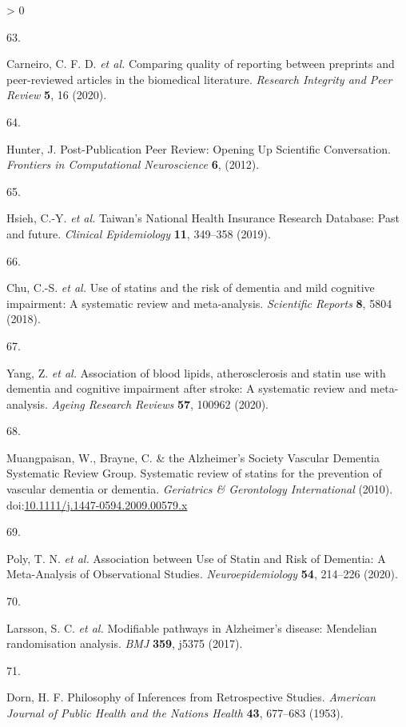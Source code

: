 \documentclass[a4paper, twoside]{templates/ociamthesis}
\newlength{\cslhangindent}
\newlength{\csllabelwidth}
\newenvironment{CSLReferences}[3] %
 {%
  \setlength{\parindent}{0pt}
  \ifodd #1 \everypar{\setlength{\hangindent}{\cslhangindent}}\ignorespaces\fi
  \ifnum #2 > 0
  \setlength{\parskip}{#2\baselineskip}
  \fi
 }%
 {}
\newcommand{\CSLLeftMargin}[1]{\parbox[t]{\maxof{\widthof{#1}}{\csllabelwidth}}{#1}}
\newcommand{\CSLRightInline}[1]{\parbox[t]{\linewidth - \csllabelwidth}{#1}}
\begin{document}
\begin{CSLReferences}{0}{0}
\leavevmode\hypertarget{ref-carneiro2020}{}%
\CSLLeftMargin{63. }
\CSLRightInline{Carneiro, C. F. D. \emph{et al.} Comparing quality of reporting between preprints and peer-reviewed articles in the biomedical literature. \emph{Research Integrity and Peer Review} \textbf{5}, 16 (2020).}

\leavevmode\hypertarget{ref-hunter2012}{}%
\CSLLeftMargin{64. }
\CSLRightInline{Hunter, J. Post-{Publication Peer Review}: {Opening Up Scientific Conversation}. \emph{Frontiers in Computational Neuroscience} \textbf{6}, (2012).}

\leavevmode\hypertarget{ref-hsieh2019}{}%
\CSLLeftMargin{65. }
\CSLRightInline{Hsieh, C.-Y. \emph{et al.} Taiwan's {National Health Insurance Research Database}: Past and future. \emph{Clinical Epidemiology} \textbf{11}, 349--358 (2019).}

\leavevmode\hypertarget{ref-chu2018b}{}%
\CSLLeftMargin{66. }
\CSLRightInline{Chu, C.-S. \emph{et al.} Use of statins and the risk of dementia and mild cognitive impairment: {A} systematic review and meta-analysis. \emph{Scientific Reports} \textbf{8}, 5804 (2018).}

\leavevmode\hypertarget{ref-yang2020}{}%
\CSLLeftMargin{67. }
\CSLRightInline{Yang, Z. \emph{et al.} Association of blood lipids, atherosclerosis and statin use with dementia and cognitive impairment after stroke: {A} systematic review and meta-analysis. \emph{Ageing Research Reviews} \textbf{57}, 100962 (2020).}

\leavevmode\hypertarget{ref-muangpaisan2010}{}%
\CSLLeftMargin{68. }
\CSLRightInline{Muangpaisan, W., Brayne, C. \& the Alzheimer's Society Vascular Dementia Systematic Review Group. Systematic review of statins for the prevention of vascular dementia or dementia. \emph{Geriatrics \& Gerontology International} (2010). doi:\href{https://doi.org/10.1111/j.1447-0594.2009.00579.x}{10.1111/j.1447-0594.2009.00579.x}}

\leavevmode\hypertarget{ref-poly2020b}{}%
\CSLLeftMargin{69. }
\CSLRightInline{Poly, T. N. \emph{et al.} Association between {Use} of {Statin} and {Risk} of {Dementia}: {A Meta}-{Analysis} of {Observational Studies}. \emph{Neuroepidemiology} \textbf{54}, 214--226 (2020).}

\leavevmode\hypertarget{ref-larsson2017a}{}%
\CSLLeftMargin{70. }
\CSLRightInline{Larsson, S. C. \emph{et al.} Modifiable pathways in {Alzheimer}'s disease: {Mendelian} randomisation analysis. \emph{BMJ} \textbf{359}, j5375 (2017).}

\leavevmode\hypertarget{ref-dorn1953}{}%
\CSLLeftMargin{71. }
\CSLRightInline{Dorn, H. F. Philosophy of {Inferences} from {Retrospective Studies}. \emph{American Journal of Public Health and the Nations Health} \textbf{43}, 677--683 (1953).}


\end{CSLReferences}
\end{document}
